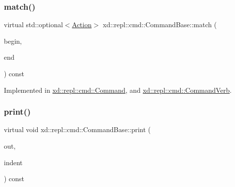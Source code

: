 \mbox{\label{classxd_1_1repl_1_1cmd_1_1_command_base_adc60ebee9e6b13fd4e9305bd436555ee}} 
\subsubsection{\texorpdfstring{match()}{match()}}
{\footnotesize\ttfamily virtual std\+::optional$<$\mbox{\hyperlink{namespacexd_1_1repl_1_1cmd_a7274841bd02a9c5da0ba48ae204ab3d5}{Action}}$>$ xd\+::repl\+::cmd\+::\+Command\+Base\+::match (\begin{DoxyParamCaption}\item[{std\+::string\+::const\+\_\+iterator}]{begin,  }\item[{std\+::string\+::const\+\_\+iterator}]{end }\end{DoxyParamCaption}) const\hspace{0.3cm}{\ttfamily [pure virtual]}}



Implemented in \mbox{\hyperlink{classxd_1_1repl_1_1cmd_1_1_command_ae36dbba2be732b38ebdac47c504fe91d}{xd\+::repl\+::cmd\+::\+Command}}, and \mbox{\hyperlink{classxd_1_1repl_1_1cmd_1_1_command_verb_ab0c91becdb62c517f88800e992b3548f}{xd\+::repl\+::cmd\+::\+Command\+Verb}}.

\mbox{\label{classxd_1_1repl_1_1cmd_1_1_command_base_acb731ef346c5c1eccce3c88749fed8e8}} 
\subsubsection{\texorpdfstring{print()}{print()}}
{\footnotesize\ttfamily virtual void xd\+::repl\+::cmd\+::\+Command\+Base\+::print (\begin{DoxyParamCaption}\item[{std\+::ostream \&}]{out,  }\item[{\mbox{\hyperlink{classxd_1_1util_1_1_indent_helper}{xd\+::util\+::\+Indent\+Helper}} \&}]{indent }\end{DoxyParamCaption}) const\hspace{0.3cm}{\ttfamily [pure virtual]}}



